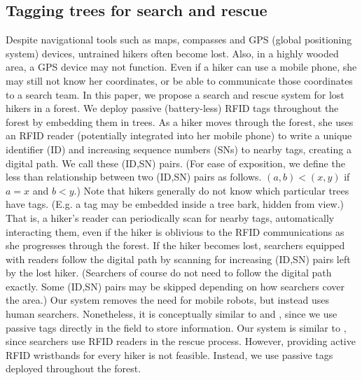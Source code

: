 \documentclass[conference]{IEEEtran}
\begin{document}
\subsection{Tagging trees for search and rescue}
Despite navigational tools such as maps, compasses and GPS (global positioning system) devices, untrained hikers often become lost.  Also, in a highly wooded area, a GPS device may not function.  Even if a hiker can use a mobile phone, she may still not know her coordinates, or be able to communicate those coordinates to a search team.  In this paper, we propose a search and rescue system for lost hikers in a forest.  We deploy passive (battery-less) RFID tags throughout the forest by embedding them in trees.  As a hiker moves through the forest, she uses an RFID reader (potentially integrated into her mobile phone) to write a unique identifier (ID) and increasing sequence numbers (SNs) to nearby tags, creating a digital path.  We call these (ID,SN) pairs.  (For ease of exposition, we define the less than relationship between two (ID,SN) pairs as follows.  $(a,b) < (x,y)$ if $a = x$ and $b < y$.)  Note that hikers generally do not know which particular trees have tags.  (E.g. a tag may be embedded inside a tree bark, hidden from view.)  That is, a hiker's reader can periodically scan for nearby tags, automatically interacting them, even if the hiker is oblivious to the RFID communications as she progresses through the forest.  If the hiker becomes lost, searchers equipped with readers follow the digital path by scanning for increasing (ID,SN) pairs left by the lost hiker.  (Searchers of course do not need to follow the digital path exactly.  Some (ID,SN) pairs may be skipped depending on how searchers cover the area.)  Our system removes the need for mobile robots, but instead uses human searchers.  Nonetheless, it is conceptually similar to \cite{conf:Hahnel01} and \cite{conf:Kleiner01}, since we use passive tags directly in the field to store information.  Our system is similar to \cite{web:search01}, since searchers use RFID readers in the rescue process.  However, providing active RFID wristbands for every hiker is not feasible.  Instead, we use passive tags deployed throughout the forest.
\end{document}
